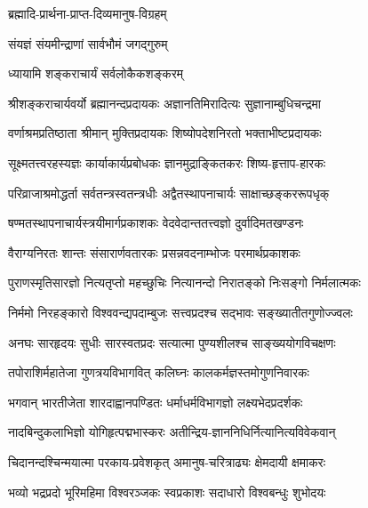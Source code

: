 

{ब्रह्मादि-प्रार्थना-प्राप्त-दिव्यमानुष-विग्रहम्}

{संयज्ञं संयमीन्द्राणां सार्वभौमं जगद्गुरुम्}

{ध्यायामि शङ्कराचार्यं सर्वलोकैकशङ्करम्	}

\begin{minipage}{\linewidth}
\centering
{}
\twolineshloka
{श्रीशङ्कराचार्यवर्यो ब्रह्मानन्दप्रदायकः}
{अज्ञानतिमिरादित्यः सुज्ञानाम्बुधिचन्द्रमा}
\end{minipage}

\twolineshloka
{वर्णाश्रमप्रतिष्ठाता श्रीमान् मुक्तिप्रदायकः}
{शिष्योपदेशनिरतो भक्ताभीष्टप्रदायकः}

\twolineshloka
{सूक्ष्मतत्त्वरहस्यज्ञः कार्याकार्यप्रबोधकः}
{ज्ञानमुद्राङ्कितकरः शिष्य-हृत्ताप-हारकः}

\twolineshloka
{परिव्राजाश्रमोद्धर्ता सर्वतन्त्रस्वतन्त्रधीः}
{अद्वैतस्थापनाचार्यः साक्षाच्छङ्कररूपधृक्}

\twolineshloka
{षण्मतस्थापनाचार्यस्त्रयीमार्गप्रकाशकः}
{वेदवेदान्ततत्त्वज्ञो दुर्वादिमतखण्डनः}

\twolineshloka
{वैराग्यनिरतः शान्तः संसारार्णवतारकः}
{प्रसन्नवदनाम्भोजः परमार्थप्रकाशकः}

\twolineshloka
{पुराणस्मृतिसारज्ञो नित्यतृप्तो महच्छुचिः}
{नित्यानन्दो निरातङ्को निःसङ्गो निर्मलात्मकः}

\twolineshloka
{निर्ममो निरहङ्कारो विश्ववन्द्यपदाम्बुजः}
{सत्त्वप्रदश्च सद्भावः सङ्ख्यातीतगुणोज्ज्वलः}

\twolineshloka
{अनघः सारहृदयः सुधीः सारस्वतप्रदः}
{सत्यात्मा पुण्यशीलश्च साङ्ख्ययोगविचक्षणः}

\twolineshloka
{तपोराशिर्महातेजा गुणत्रयविभागवित्}
{कलिघ्नः कालकर्मज्ञस्तमोगुणनिवारकः}

\twolineshloka
{भगवान् भारतीजेता शारदाह्वानपण्डितः}
{धर्माधर्मविभागज्ञो लक्ष्यभेदप्रदर्शकः}

\twolineshloka
{नादबिन्दुकलाभिज्ञो योगिहृत्पद्मभास्करः}
{अतीन्द्रिय-ज्ञाननिधिर्नित्यानित्यविवेकवान्}

\twolineshloka
{चिदानन्दश्चिन्मयात्मा परकाय-प्रवेशकृत्}
{अमानुष-चरित्राढ्यः क्षेमदायी क्षमाकरः}

\twolineshloka
{भव्यो भद्रप्रदो भूरिमहिमा विश्वरञ्जकः}
{स्वप्रकाशः सदाधारो विश्वबन्धुः शुभोदयः}

